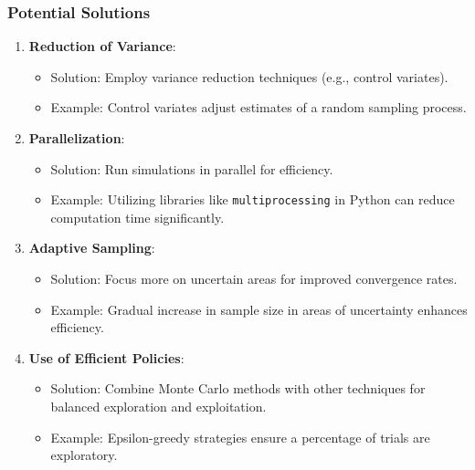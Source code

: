 \documentclass[aspectratio=169]{beamer}
\begin{document}
\begin{frame}
    \frametitle{Potential Solutions}
    \begin{enumerate}
        \item \textbf{Reduction of Variance}:
            \begin{itemize}
                \item Solution: Employ variance reduction techniques (e.g., control variates).
                \item Example: Control variates adjust estimates of a random sampling process.
            \end{itemize}
        \item \textbf{Parallelization}:
            \begin{itemize}
                \item Solution: Run simulations in parallel for efficiency.
                \item Example: Utilizing libraries like \texttt{multiprocessing} in Python can reduce computation time significantly.
            \end{itemize}
        \item \textbf{Adaptive Sampling}:
            \begin{itemize}
                \item Solution: Focus more on uncertain areas for improved convergence rates.
                \item Example: Gradual increase in sample size in areas of uncertainty enhances efficiency.
            \end{itemize}
        \item \textbf{Use of Efficient Policies}:
            \begin{itemize}
                \item Solution: Combine Monte Carlo methods with other techniques for balanced exploration and exploitation.
                \item Example: Epsilon-greedy strategies ensure a percentage of trials are exploratory.
            \end{itemize}
    \end{enumerate}
\end{frame}
\end{document}
